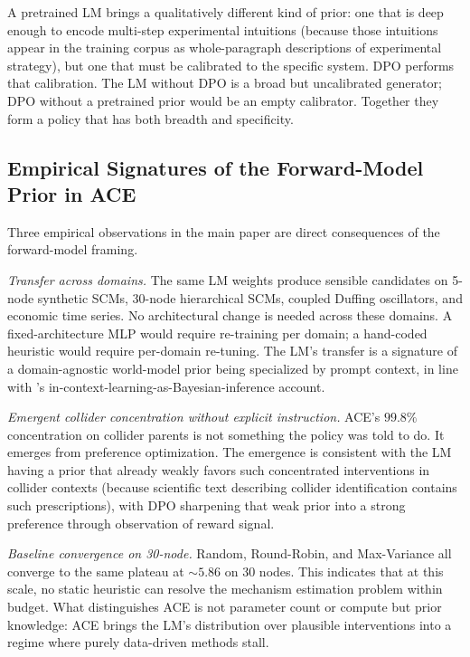 \documentclass[twoside]{article}
\theoremstyle{plain}
\theoremstyle{definition}
\theoremstyle{remark}
\begin{document}
A pretrained LM brings a qualitatively different kind of prior: one that is deep enough to encode multi-step experimental intuitions (because those intuitions appear in the training corpus as whole-paragraph descriptions of experimental strategy), but one that must be calibrated to the specific system. DPO performs that calibration. The LM without DPO is a broad but uncalibrated generator; DPO without a pretrained prior would be an empty calibrator. Together they form a policy that has both breadth and specificity.

\subsection{Empirical Signatures of the Forward-Model Prior in ACE}

Three empirical observations in the main paper are direct consequences of the forward-model framing.

\emph{Transfer across domains.} The same LM weights produce sensible candidates on 5-node synthetic SCMs, 30-node hierarchical SCMs, coupled Duffing oscillators, and economic time series. No architectural change is needed across these domains. A fixed-architecture MLP would require re-training per domain; a hand-coded heuristic would require per-domain re-tuning. The LM's transfer is a signature of a domain-agnostic world-model prior being specialized by prompt context, in line with \citet{xie2022explanation}'s in-context-learning-as-Bayesian-inference account.

\emph{Emergent collider concentration without explicit instruction.} ACE's $99.8\%$ concentration on collider parents is not something the policy was told to do. It emerges from preference optimization. The emergence is consistent with the LM having a prior that already weakly favors such concentrated interventions in collider contexts (because scientific text describing collider identification contains such prescriptions), with DPO sharpening that weak prior into a strong preference through observation of reward signal.

\emph{Baseline convergence on 30-node.} Random, Round-Robin, and Max-Variance all converge to the same plateau at $\sim\!5.86$ on 30 nodes. This indicates that at this scale, no static heuristic can resolve the mechanism estimation problem within budget. What distinguishes ACE is not parameter count or compute but prior knowledge: ACE brings the LM's distribution over plausible interventions into a regime where purely data-driven methods stall.
\end{document}
